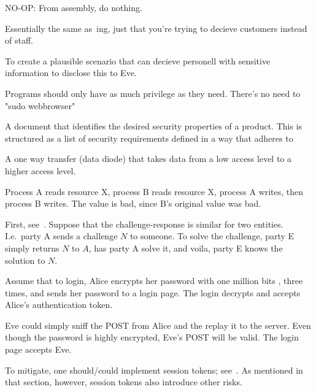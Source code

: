 \begin{definition}[No-operation]{NO-OP:}
    From assembly, do nothing. 
\end{definition}

\begin{definition}[Phishing]
    Essentially the same as~ing, just that you're trying to
    decieve customers instead of staff.
\end{definition}

\begin{definition}[Pretext]\label{pretext}
    To create a plausible scenario that can decieve personell with 
    sensitive information to disclose this to Eve.
\end{definition}

\begin{definition}
    Programs should only have as much privilege as they need.
    There's no need to "sudo webbrowser"

\end{definition}

\begin{definition}
    A document that identifies the desired security properties of a product.
    This is structured as a list of security requirements defined 
    in a way that adheres to~
\end{definition}

\begin{definition}[Pump]
    A one way transfer (data diode) that takes data from
    a low access level to a higher access level. 
\end{definition}

\begin{definition}
    Process A reads resource X, process B reads resource X,
    process A writes, then process B writes. The value is bad, since B's
    original value was bad.
\end{definition}

\begin{definition}
    First, see~.
    Suppose that the challenge-response is similar for two
    entities. I.e.\ party A sends a challenge $N$ to someone.
    To solve the challenge, party E simply returns $N$ to $A$,
    has party A solve it, and voila, party E knows the solution to $N$.
\end{definition}

\begin{definition} 
    Assume that to login, Alice encrypts her password with one million bits
    , three times, and sends her password to a login page. The login
    decrypts and accepts Alice's authentication token.

    Eve could simply sniff the POST from Alice and the replay it to the 
    server. Even though the password is highly encrypted,
    Eve's POST will be valid. The login page accepts Eve.

    To mitigate, one should/could implement session tokens;
    see~. As mentioned in that section, however, session
    tokens also introduce other risks.
\end{definition}

